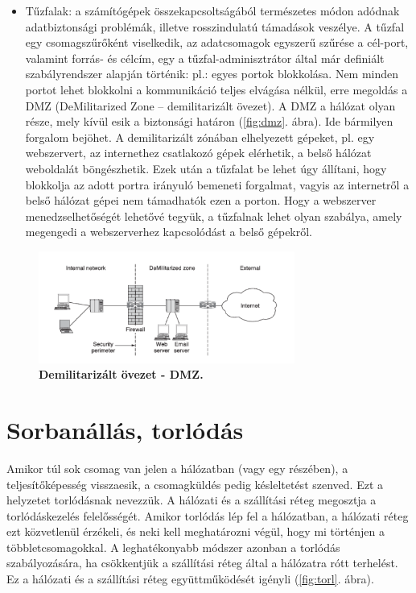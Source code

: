 \documentclass[12pt]{article}
\theoremstyle{plain}
\begin{document}
\begin{itemize}
    \item Tűzfalak: a számítógépek összekapcsoltságából természetes módon adódnak adatbiztonsági problémák, illetve rosszindulatú támadások  veszélye. A tűzfal egy csomagszűrőként viselkedik, az adatcsomagok egyszerű szűrése a cél-port, valamint forrás- és célcím, egy a tűzfal-adminisztrátor által már definiált szabályrendszer alapján történik: pl.: egyes portok blokkolása. Nem minden portot lehet blokkolni a kommunikáció teljes elvágása nélkül, erre megoldás a DMZ (DeMilitarized Zone – demilitarizált övezet). A DMZ a  hálózat olyan része, mely kívül esik a biztonsági határon (\ref{fig:dmz}. ábra). Ide bármilyen forgalom bejöhet. A demilitarizált zónában elhelyezett gépeket, pl. egy webszervert, az internethez csatlakozó gépek elérhetik, a belső hálózat weboldalát böngészhetik. Ezek után a tűzfalat be lehet úgy állítani, hogy blokkolja az adott portra irányuló bemeneti forgalmat, vagyis az internetről a belső hálózat gépei nem támadhatók ezen a porton. Hogy a webszerver menedzselhetőségét lehetővé tegyük, a tűzfalnak lehet olyan szabálya, amely megengedi a webszerverhez kapcsolódást a belső gépekről.
\end{itemize}{}

    \begin{figure}[H]
    \begin{center}
    \includegraphics[width=0.75\textwidth]{media/dmz.png}
    \caption{\textbf{Demilitarizált övezet - DMZ.}}
    \label{fig:nat}
    \end{center}
\end{figure}


\section{Sorbanállás, torlódás}

Amikor túl sok csomag van jelen a hálózatban (vagy egy részében), a teljesítőképesség visszaesik, a csomagküldés pedig késleltetést szenved. Ezt a helyzetet torlódásnak nevezzük. A hálózati és a szállítási réteg megosztja a torlódáskezelés felelősségét. Amikor torlódás lép fel a hálózatban, a hálózati réteg ezt közvetlenül érzékeli, és neki kell meghatározni végül, hogy mi történjen a többletcsomagokkal. A leghatékonyabb módszer azonban a torlódás szabályozására, ha csökkentjük a szállítási réteg által a hálózatra rótt terhelést. Ez a hálózati és a szállítási réteg együttműködését igényli (\ref{fig:torl}. ábra).
\end{document}
